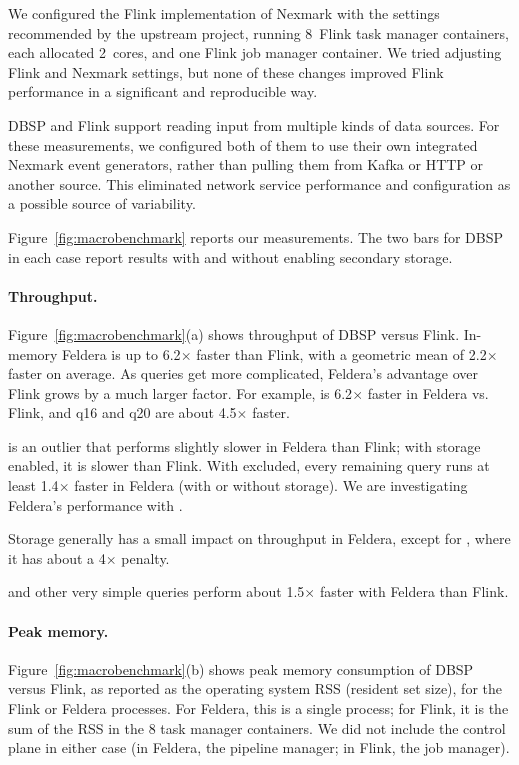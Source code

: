 We configured the Flink implementation of Nexmark with the settings
recommended by the upstream project, running 8~Flink task manager
containers, each allocated 2~cores, and one Flink job manager
container.  We tried adjusting Flink and Nexmark settings, but none of
these changes improved Flink performance in a significant and
reproducible way.

DBSP and Flink support reading input from multiple kinds of data
sources.  For these measurements, we configured both of them to use
their own integrated Nexmark event generators, rather than pulling
them from Kafka or HTTP or another source.  This eliminated network
service performance and configuration as a possible source of
variability.

Figure~\ref{fig:macrobenchmark} reports our measurements.  The two
bars for DBSP in each case report results with and without enabling
secondary storage.


\paragraph{Throughput.}

\newcommand{\x}{\(\times\)}

Figure~\ref{fig:macrobenchmark}(a) shows throughput of DBSP versus
Flink.  In-memory Feldera is up to 6.2\x{} faster than Flink,
with a geometric mean of 2.2\x{} faster on average.  As queries
get more complicated, Feldera's advantage over Flink grows by a much
larger factor.  For example,  is 6.2\x{} faster in
Feldera vs. Flink, and q16 and q20 are about 4.5\x{} faster.

 is an outlier that performs slightly slower in Feldera
than Flink; with storage enabled, it is slower than Flink.  With
 excluded, every remaining query runs at least
1.4\x{} faster in Feldera (with or without storage).  We are
investigating Feldera's performance with .

Storage generally has a small impact on throughput in Feldera, except
for , where it has about a 4\x{} penalty.

 and other very simple queries perform about 1.5\x{} faster
with Feldera than Flink.

\paragraph{Peak memory.}

Figure~\ref{fig:macrobenchmark}(b) shows peak memory consumption of
DBSP versus Flink, as reported as the operating system RSS (resident
set size), for the Flink or Feldera processes.  For Feldera, this is a
single process; for Flink, it is the sum of the RSS in the 8 task
manager containers.  We did not include the control plane in either
case (in Feldera, the pipeline manager; in Flink, the job manager).


